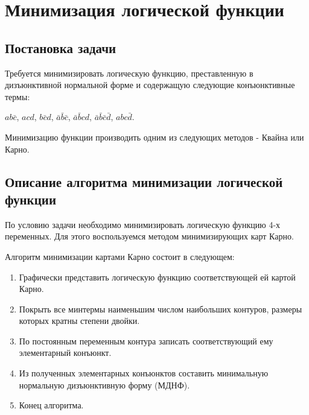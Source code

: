 \section{Минимизация логической функции}

\subsection{Постановка задачи}

Требуется минимизировать логическую функцию, преставленную в дизъюнктивной нормальной форме 
и содержащую следующие конъюнктивные термы:

\begin{center}
    $ab\bar{c}$,
    $acd$,
    $b\bar{c}d$,
    $\bar{a}\bar{b}\bar{c}$,
    $\bar{a}\bar{b}cd$,
    $\bar{a}\bar{b}\bar{c}\bar{d}$,
    $abc\bar{d}$.
\end{center}

Минимизацию функции производить одним из следующих методов - Квайна или Карно.

\subsection{Описание алгоритма минимизации логической функции}

По условию задачи необходимо минимизировать логическую функцию 4-х переменных.
Для этого воспользуемся методом минимизирующих карт Карно.

\vspace{1em}

Алгоритм минимизации картами Карно состоит в следующем:

\begin{enumerate}
    \item Графически представить логическую функцию соответствующей ей картой Карно.

    \item Покрыть все минтермы наименьшим числом наибольших контуров, размеры которых кратны степени двойки.

    \item По постоянным переменным контура записать соответствующий ему элементарный конъюнкт.
    
    \item Из полученных элементарных конъюнктов составить минимальную нормальную дизъюнктивную форму (МДНФ).

    \item Конец алгоритма.
\end{enumerate}


